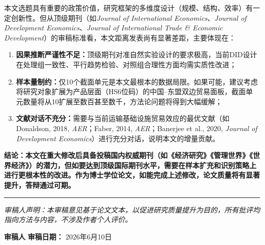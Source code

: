 \documentclass[12pt, a4paper]{article}
\begin{document}
\begin{notebox}[编辑建议]

本文选题具有重要的政策价值，研究框架的多维度设计（规模、结构、效率）有一定创新性。但从顶级期刊（如\textit{Journal of International Economics}、\textit{Journal of Development Economics}、\textit{Journal of International Trade \& Economic Development}）的审稿标准看，本文距离发表尚有显著差距，主要体现在：

\begin{enumerate}[label=\arabic*)]
  \item \textbf{因果推断严谨性不足：}顶级期刊对准自然实验设计的要求极高，当前DID设计在处理组一致性、平行趋势检验、对照组合理性方面均需实质性改进；

  \item \textbf{样本量制约：}仅10个截面单元是本文最根本的数据局限。如果可能，建议考虑将研究对象扩展为产品层面（HS6位码）的中国--东盟双边贸易面板，截面单元数量将从10扩展至数百甚至数千，方法论问题将得到大幅缓解；

  \item \textbf{文献对话不充分：}需要与当前运输基础设施贸易效应的最优文献（如Donaldson, 2018, \textit{AER}；Faber, 2014, \textit{AER}；Banerjee et al., 2020, \textit{Journal of Development Economics}）进行充分对话，说明本文的增量贡献。
\end{enumerate}

\textbf{结论：本文在重大修改后具备投稿国内权威期刊（如《经济研究》《管理世界》《世界经济》）的潜力，但如要达到顶级国际期刊水平，需要在样本扩充和识别策略上进行更根本性的改进。作为博士学位论文，如能完成上述修改，论文质量将有显著提升，答辩通过可期。}
\end{notebox}

\vspace{2em}
\noindent\rule{\textwidth}{0.8pt}

\noindent\textit{审稿人声明：本审稿意见基于论文文本，以促进研究质量提升为目的，所有批评均指向方法与内容，不涉及作者个人评价。}

\vspace{1em}

\noindent\textbf{审稿人} \hfill \textbf{审稿日期：} 2026年6月10日

\vspace{3em}
\end{document}
